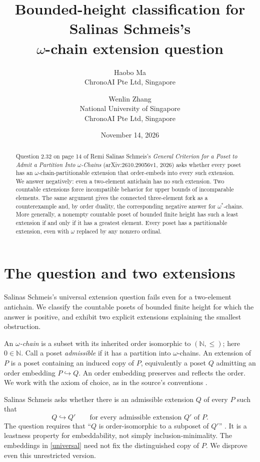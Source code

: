 \documentclass[11pt]{article}
\title{Bounded-height classification for Salinas Schmeis's\texorpdfstring{\\$\omega$}{ omega}-chain extension question}
\author{Haobo Ma\\\small ChronoAI Pte Ltd, Singapore
\and Wenlin Zhang\\\small National University of Singapore\\\small ChronoAI Pte Ltd, Singapore}
\date{November 14, 2026}
\newcommand{\N}{\mathbb N}
\begin{document}
\maketitle
\begin{abstract}
Question 2.32 on page 14 of Remi Salinas Schmeis's \emph{General Criterion
for a Poset to Admit a Partition Into $\omega$-Chains}
(arXiv:2610.29056v1, 2026) asks whether every poset has an
$\omega$-chain-partitionable extension that order-embeds into every such
extension. We answer negatively: even a two-element antichain has no such
extension. Two countable extensions force incompatible behavior for upper
bounds of incomparable elements. The same argument gives the connected
three-element fork as a counterexample and, by order duality, the corresponding
negative answer for $\omega^*$-chains. More generally, a nonempty countable
poset of bounded finite height has such a least extension if and only if it
has a greatest element. Every poset has a partitionable extension, even
with $\omega$ replaced by any nonzero ordinal.
\end{abstract}

\section{The question and two extensions}
Salinas Schmeis's universal extension question fails even for a two-element
antichain. We classify the countable posets of bounded finite height for
which the answer is positive, and exhibit two explicit extensions explaining
the smallest obstruction.

An \emph{$\omega$-chain} is a subset with its inherited order isomorphic to
$(\N,\leq)$; here $0\in\N$. Call a poset \emph{admissible} if it has a partition
into $\omega$-chains. An extension of $P$ is a poset containing an induced copy
of $P$, equivalently a poset $Q$ admitting an order embedding $P\hookrightarrow Q$.
An order embedding preserves and reflects the order.
We work with the axiom of choice, as in the source's conventions
\cite[p.~2]{salinas}.

Salinas Schmeis \cite[Question 2.32, p.~14]{salinas} asks whether there is an
admissible extension $Q$ of every $P$ such that
\begin{equation}\label{universal}
 Q\hookrightarrow Q' \qquad\text{for every admissible extension }Q'\text{ of }P.
\end{equation}
The question requires that ``$Q$ is order-isomorphic to a subposet of $Q'$''
\cite[p.~14]{salinas}. It is a leastness property for
embeddability, not simply inclusion-minimality. The embeddings in
\eqref{universal} need not fix the distinguished copy of $P$. We disprove even
this unrestricted version.
\end{document}
